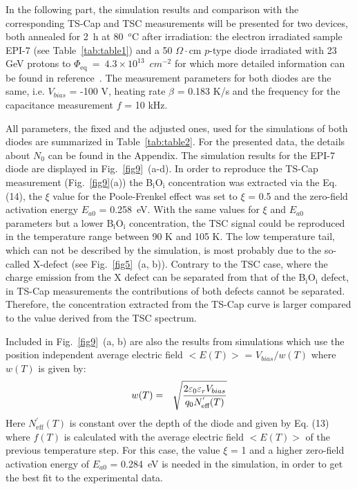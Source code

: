 \documentclass[final, 5p, times]{elsarticle}
\begin{document}
In the following part, the simulation results and comparison with the corresponding TS-Cap and TSC measurements will be presented for two devices, both annealed for 2~h at 80~$^o$C after irradiation: the electron irradiated sample EPI-7 (see Table~\ref{tab:table1}) and a 50 $\si{\Omega\cdot}$cm $p$-type diode irradiated with 23 GeV protons to $\Phi_\text{eq}$~=~$4.3 \times 10^{13}$~$\si{cm^{-2}}$ for which more detailed information can be found in reference~\cite{b27}. The measurement parameters for both diodes
are the same, i.e. $V_{bias}$  = -100 V, heating rate $\beta$ = 0.183 K/s and the frequency for the capacitance measurement $f$ = 10 kHz. 
\par
All parameters, the fixed and the adjusted ones, used for the simulations of both diodes are summarized in Table~\ref{tab:table2}. For the presented data, the details about $N_{0}$ can be found in the Appendix. The simulation results for the EPI-7 diode are displayed in Fig.~\ref{fig9}~(a-d). In order to reproduce the TS-Cap measurement (Fig.~\ref{fig9}(a)) the B$_\text{i}$O$_\text{i}$ concentration was extracted via the Eq. (14), the $\xi$ value for the Poole-Frenkel effect was set to $\xi$ = 0.5 and the zero-field activation energy $E_{a0}$ = 0.258~eV. With the same values for $\xi$ and $E_{a0}$ parameters but a lower B$_\text{i}$O$_\text{i}$ concentration, the TSC signal could be reproduced in the temperature range between 90 K and 105 K. The low temperature tail, which can not be described by the simulation, is most probably due to the so-called X-defect (see Fig.~\ref{fig5}~(a, b)). Contrary to the TSC case, where the charge emission from the X defect can be separated from that of the B$_\text{i}$O$_\text{i}$ defect, in TS-Cap measurements the contributions of both defects cannot be separated. Therefore, the concentration extracted from the TS-Cap curve is larger compared to the value derived from the TSC spectrum.
\par
Included in Fig.~\ref{fig9}~(a, b) are also the results from simulations which use the position independent average electric field $<E(T)>$ = $V_{bias}/w(T)$ where $w(T)$ is given by: 
\begin{eqnarray} 
w(T)  & = & \sqrt{{{2 \varepsilon_0 \varepsilon_r V_{bias}} \over {q_0 N^{'}_\text{eff}(T)}}}
\end{eqnarray}
Here $N^{'}_\text{eff}(T)$ is constant over the depth of the diode and given by Eq. (13) where $f(T)$ is calculated with the average electric field $<E(T)>$ of the previous temperature step. For this case, the value $\xi$ = 1 and a higher zero-field activation energy of $E_{a0}$ = 0.284~eV is needed in the simulation, in order to get the best fit to the experimental data.
\par
\end{document}
